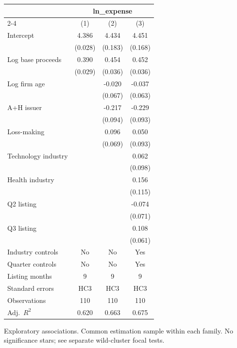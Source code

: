 \begin{table}[!htbp]\centering
\begin{tabular}{lccc}
\toprule
 & \multicolumn{3}{c}{ln\_expense} \\
\cmidrule(lr){2-4}
 & (1) & (2) & (3) \\
\midrule
Intercept & 4.386 & 4.434 & 4.451 \\
 & (0.028) & (0.183) & (0.168) \\
Log base proceeds & 0.390 & 0.454 & 0.452 \\
 & (0.029) & (0.036) & (0.036) \\
Log firm age &  & -0.020 & -0.037 \\
 &  & (0.067) & (0.063) \\
A+H issuer &  & -0.217 & -0.229 \\
 &  & (0.094) & (0.093) \\
Loss-making &  & 0.096 & 0.050 \\
 &  & (0.069) & (0.093) \\
Technology industry &  &  & 0.062 \\
 &  &  & (0.098) \\
Health industry &  &  & 0.156 \\
 &  &  & (0.115) \\
Q2 listing &  &  & -0.074 \\
 &  &  & (0.071) \\
Q3 listing &  &  & 0.108 \\
 &  &  & (0.061) \\
\midrule
Industry controls & No & No & Yes \\
Quarter controls & No & No & Yes \\
Listing months & 9 & 9 & 9 \\
Standard errors & HC3 & HC3 & HC3 \\
Observations & 110 & 110 & 110 \\
Adj.\ $R^2$ & 0.620 & 0.663 & 0.675 \\
\bottomrule
\end{tabular}
\par\vspace{2pt}\begin{minipage}{0.95\linewidth}\footnotesize Exploratory associations. Common estimation sample within each family. No significance stars; see separate wild-cluster focal tests.\end{minipage}
\end{table}